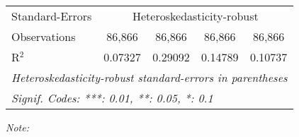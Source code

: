 \begin{table}[htbp!]
\begin{adjustbox}{width = 1\textwidth, max height = 0.95\textheight, center}
\begin{threeparttable}[b]
\begin{tabular}{lcccc}
            \midrule 
            Standard-Errors & \multicolumn{4}{c}{Heteroskedasticity-robust} \\ 
            Observations         & 86,866                         & 86,866                         & 86,866                          & 86,866\\  
            R$^2$                & 0.07327                        & 0.29092                        & 0.14789                         & 0.10737\\  
            \midrule \midrule
            \multicolumn{5}{l}{\emph{Heteroskedasticity-robust standard-errors in parentheses}}\\
            \multicolumn{5}{l}{\emph{Signif. Codes: ***: 0.01, **: 0.05, *: 0.1}}\\
         \end{tabular}
         
         \begin{tablenotes}\item \medskip \textit{Note:}
         \end{tablenotes}
      \end{threeparttable}
   \end{adjustbox}
\end{table}


